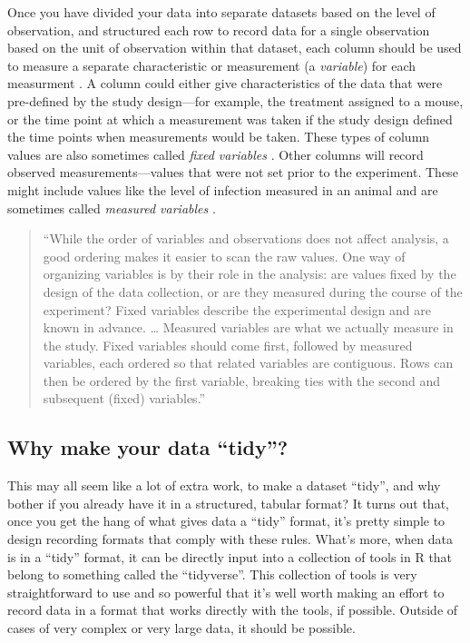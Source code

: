 \documentclass[]{tufte-book}
\begin{document}
Once you have divided your data into separate datasets based on the level of
observation, and structured each row to record data for a single observation
based on the unit of observation within that dataset, each column should be used
to measure a separate characteristic or measurement (a \emph{variable}) for each
measurment \citep{wickham2014tidy}. A column could either give characteristics of the data
that were pre-defined by the study design---for example, the treatment assigned
to a mouse, or the time point at which a measurement was taken if the study
design defined the time points when measurements would be taken. These types of
column values are also sometimes called \emph{fixed variables} \citep{wickham2014tidy}. Other
columns will record observed measurements---values that were not set prior to
the experiment. These might include values like the level of infection measured
in an animal and are sometimes called \emph{measured variables} \citep{wickham2014tidy}.

\begin{quote}
``While the order of variables and observations does not affect analysis, a
good ordering makes it easier to scan the raw values. One way of organizing
variables is by their role in the analysis: are values fixed by the design of
the data collection, or are they measured during the course of the experiment?
Fixed variables describe the experimental design and are known in advance.
\ldots{} Measured variables are what we actually measure in the study. Fixed
variables should come first, followed by measured variables, each ordered so
that related variables are contiguous. Rows can then be ordered by the first
variable, breaking ties with the second and subsequent (fixed) variables.''
\citep{wickham2014tidy}
\end{quote}

\hypertarget{why-make-your-data-tidy}{%
\subsection{Why make your data ``tidy''?}\label{why-make-your-data-tidy}}

This may all seem like a lot of extra work, to make a dataset ``tidy'', and why
bother if you already have it in a structured, tabular format? It turns out
that, once you get the hang of what gives data a ``tidy'' format, it's pretty
simple to design recording formats that comply with these rules. What's more,
when data is in a ``tidy'' format, it can be directly input into a collection
of tools in R that belong to something called the ``tidyverse''. This collection
of tools is very straightforward to use and so powerful that it's well worth
making an effort to record data in a format that works directly with the
tools, if possible. Outside of cases of very complex or very large data, it
should be possible.
\end{document}
